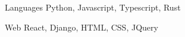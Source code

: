



\begin{cvskills}


  \cvskill
    {Languages} %
    {Python, Javascript, Typescript, Rust} %


  \cvskill
    {Web} %
    {React, Django, HTML, CSS, JQuery} %


\end{cvskills}
